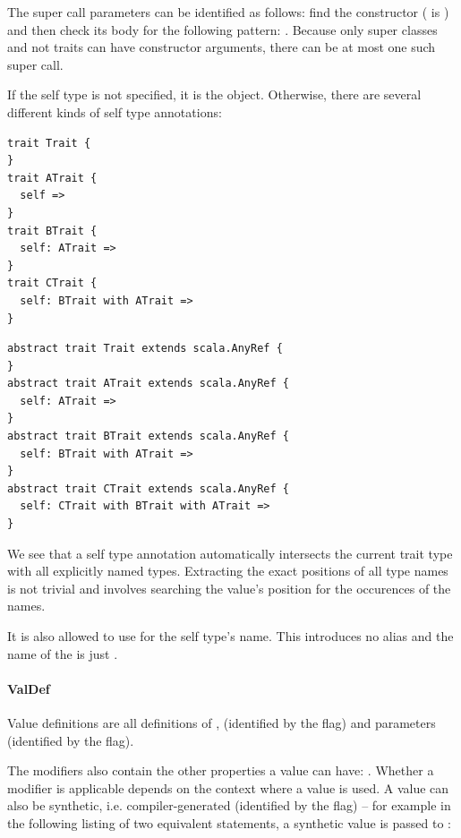 The super call parameters can be identified as follows: find the constructor  ( is ) and then check its body  for the following pattern: . Because only super classes and not traits can have constructor arguments, there can be at most one such super call.

If the self type is not specified, it is the  object. Otherwise, there are several different kinds of self type annotations:

\begin{multicols}{2}
\begin{lstlisting}
trait Trait {
}
trait ATrait {
  self =>
}
trait BTrait {
  self: ATrait =>
}
trait CTrait {
  self: BTrait with ATrait =>
}
\end{lstlisting}
\begin{lstlisting}
abstract trait Trait extends scala.AnyRef {
}
abstract trait ATrait extends scala.AnyRef { 
  self: ATrait => 
}
abstract trait BTrait extends scala.AnyRef {
  self: BTrait with ATrait =>
}
abstract trait CTrait extends scala.AnyRef {
  self: CTrait with BTrait with ATrait =>
}
\end{lstlisting}
\end{multicols}

We see that a self type annotation automatically intersects the current trait type with all explicitly named types. Extracting the exact positions of all type names is not trivial and involves searching the value's position for the occurences of the names.

It is also allowed to use  for the self type's name. This introduces no alias and the name of the  is just \src{\_}.

\paragraph{ValDef} 

\noindent Value definitions are all definitions of ,  (identified by the \textsc{} flag) and parameters (identified by the \textsc{} flag).

The modifiers also contain the other properties a value can have: . Whether a modifier is applicable depends on the context where a value is used. A value can also be synthetic, i.e. compiler-generated (identified by the \textsc{} flag) -- for example in the following listing of two equivalent statements, a synthetic value is passed to :

